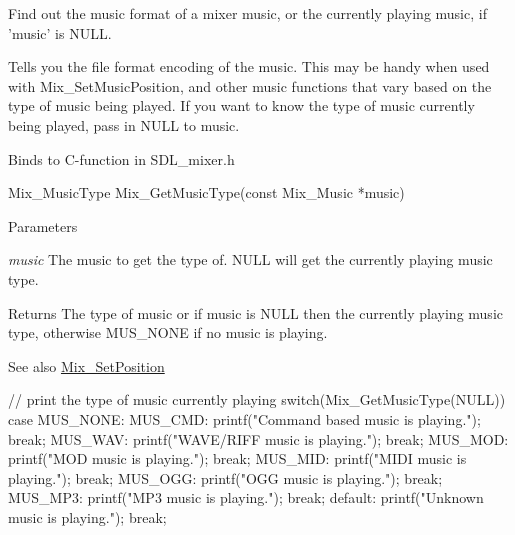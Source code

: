 Find out the music format of a mixer music, or the currently playing music, if 'music' is NULL. 

Tells you the file format encoding of the music. This may be handy when used with Mix\_\-SetMusicPosition, and other music functions that vary based on the type of music being played. If you want to know the type of music currently being played, pass in NULL to music. 

Binds to C-\/function in SDL\_\-mixer.h 
\begin{DoxyCode}
Mix_MusicType Mix_GetMusicType(const Mix_Music *music)
\end{DoxyCode}
 


\begin{DoxyParams}{Parameters}
\item[{\em music}]The music to get the type of. NULL will get the currently playing music type. \end{DoxyParams}
\begin{DoxyReturn}{Returns}
The type of music or if music is NULL then the currently playing music type, otherwise MUS\_\-NONE if no music is playing.
\end{DoxyReturn}
\begin{DoxySeeAlso}{See also}
\hyperlink{namespace_tao_1_1_sdl_ad33cd3ef7af676c3717a45839d65ab82}{Mix\_\-SetPosition}


\end{DoxySeeAlso}

\begin{DoxyCode}
                     // print the type of music currently playing
                                switch(Mix_GetMusicType(NULL))
                        {
                                case MUS_NONE:
                                MUS_CMD:
                                printf("Command based music is playing.\n");
                                break;
                                MUS_WAV:
                                printf("WAVE/RIFF music is playing.\n");
                                break;
                                MUS_MOD:
                                printf("MOD music is playing.\n");
                                break;
                                MUS_MID:
                                printf("MIDI music is playing.\n");
                                break;
                                MUS_OGG:
                                printf("OGG music is playing.\n");
                                break;
                                MUS_MP3:
                                printf("MP3 music is playing.\n");
                                break;
                                default:
                                printf("Unknown music is playing.\n");
                                break;
                        }
\end{DoxyCode}


